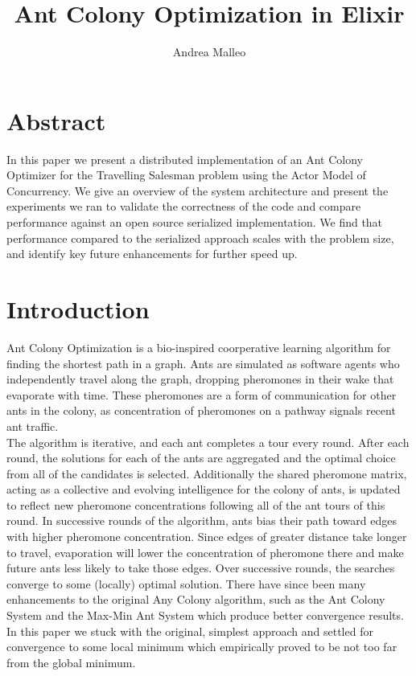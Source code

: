 \documentclass[12pt]{article}
\title{Ant Colony Optimization in Elixir}
\author{Andrea Malleo}
\begin{document}
\maketitle
\section{Abstract}
In this paper we present a distributed implementation of an Ant Colony Optimizer 
for the Travelling Salesman problem using the Actor Model of Concurrency. We give
an overview of the system architecture and present the experiments we ran to validate 
the correctness of the code and compare performance against an open source serialized 
implementation. We find that performance compared to the serialized approach scales 
with the problem size, and identify key future enhancements for further speed up.


\section{Introduction}Ant Colony Optimization \cite{Dorigo1997AntCS} is a bio-inspired coorperative learning algorithm for 
    finding the shortest path in a graph. Ants are simulated as software agents who 
    independently travel along the graph, dropping pheromones in their wake that 
    evaporate with time. These pheromones are a form of communication for other ants in
    the colony, as concentration of pheromones on a pathway signals recent ant traffic. \\

    The algorithm is iterative, and each ant completes a tour every round.
    After each round, the solutions for each of the ants are aggregated
    and the optimal choice from all of the candidates is selected. 
    Additionally the shared pheromone matrix, acting as a collective and evolving intelligence 
    for the colony of ants, is updated to reflect new pheromone concentrations following all of the 
    ant tours of this round.  In successive rounds of the algorithm, ants bias their path 
    toward edges with higher pheromone concentration. Since edges of greater distance take 
    longer to travel, evaporation will lower the concentration of pheromone there and make 
    future ants less likely to take those edges. Over successive rounds, the searches converge
    to some (locally) optimal solution. 
    There have since been many enhancements to the original Any Colony algorithm,
    such as the Ant Colony System \cite{Dorigo1999AntCO} and the Max-Min Ant System \cite{maxMin} 
    which produce better convergence results. In this paper we stuck with the original, simplest 
    approach and settled for convergence to some local minimum which empirically proved to be 
    not too far from the global minimum.\\
\end{document}
